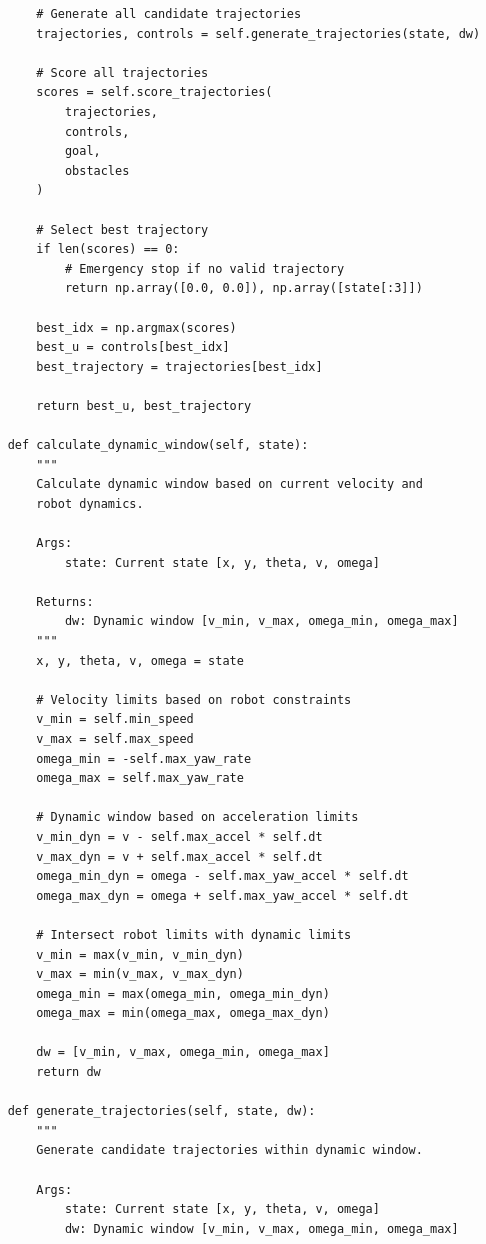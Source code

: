 \begin{lstlisting}
        # Generate all candidate trajectories
        trajectories, controls = self.generate_trajectories(state, dw)
        
        # Score all trajectories
        scores = self.score_trajectories(
            trajectories, 
            controls,
            goal, 
            obstacles
        )
        
        # Select best trajectory
        if len(scores) == 0:
            # Emergency stop if no valid trajectory
            return np.array([0.0, 0.0]), np.array([state[:3]])
        
        best_idx = np.argmax(scores)
        best_u = controls[best_idx]
        best_trajectory = trajectories[best_idx]
        
        return best_u, best_trajectory
    
    def calculate_dynamic_window(self, state):
        """
        Calculate dynamic window based on current velocity and 
        robot dynamics.
        
        Args:
            state: Current state [x, y, theta, v, omega]
            
        Returns:
            dw: Dynamic window [v_min, v_max, omega_min, omega_max]
        """
        x, y, theta, v, omega = state
        
        # Velocity limits based on robot constraints
        v_min = self.min_speed
        v_max = self.max_speed
        omega_min = -self.max_yaw_rate
        omega_max = self.max_yaw_rate
        
        # Dynamic window based on acceleration limits
        v_min_dyn = v - self.max_accel * self.dt
        v_max_dyn = v + self.max_accel * self.dt
        omega_min_dyn = omega - self.max_yaw_accel * self.dt
        omega_max_dyn = omega + self.max_yaw_accel * self.dt
        
        # Intersect robot limits with dynamic limits
        v_min = max(v_min, v_min_dyn)
        v_max = min(v_max, v_max_dyn)
        omega_min = max(omega_min, omega_min_dyn)
        omega_max = min(omega_max, omega_max_dyn)
        
        dw = [v_min, v_max, omega_min, omega_max]
        return dw
    
    def generate_trajectories(self, state, dw):
        """
        Generate candidate trajectories within dynamic window.
        
        Args:
            state: Current state [x, y, theta, v, omega]
            dw: Dynamic window [v_min, v_max, omega_min, omega_max]
            

\end{lstlisting}
